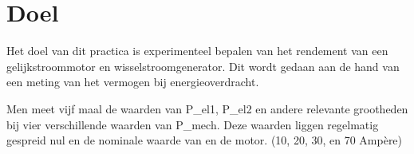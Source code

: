 \section{Doel}
Het doel van dit practica is experimenteel bepalen van het rendement van een gelijkstroommotor en wisselstroomgenerator. Dit wordt gedaan aan de hand van een meting van het vermogen bij energieoverdracht.

Men meet vijf maal de waarden van P_{el1}, P_{el2} en andere relevante grootheden bij vier verschillende waarden van P_{mech}. Deze waarden liggen regelmatig gespreid nul en de nominale waarde van en de motor. (10, 20, 30, en 70 Ampère)
